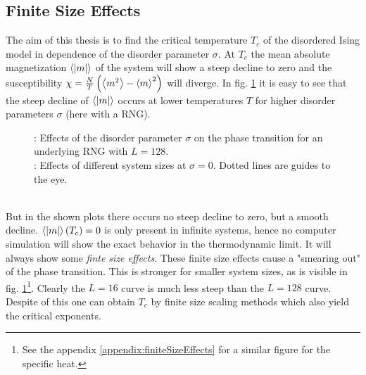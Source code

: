 \subsection{Finite Size Effects}
\label{ssec:finitesize}
    The aim of this thesis is to find the critical temperature \(T_c\)
    of the disordered Ising model in dependence of the disorder parameter
    \(\sigma\). At \(T_c\) the mean absolute magnetization \(\left< |m| \right>\) of
    the system will show a steep decline to zero and the susceptibility
    \(\chi = \frac{N}{T}\left(\left< m^2 \right>-\left< m \right>^2\right)\)
    will diverge. In fig. \ref{fig:smeared_out}
    it is easy to see that the steep decline of \(\left< |m| \right>\)
    occurs at lower temperatures \(T\) for higher
    disorder parameters \(\sigma\) (here with a RNG).
    \begin{figure}[htbp]
        \centering
        \caption[Phase Transition and Finite Size Effects]
        {
            : Effects of the disorder
            parameter $\sigma$ on the phase transition
            for an underlying RNG with $L=128$.\\
            : Effects of different system
            sizes at \(\sigma = 0\). Dotted lines are guides to the eye.
        }
        \label{fig:smeared_out}
    \end{figure}\\
    But in the shown plots there occurs no steep decline to zero, but a
    smooth decline. \(\left< \left\vert m\right\vert \right>(T_c) = 0\) is only present in infinite
    systems, hence no computer simulation will show the exact behavior in the
    thermodynamic limit. It will always show some \emph{finte size effects}.
    These finite size effects cause a "smearing out" of the phase
    transition. This is stronger for smaller system sizes, as is visible
    in fig. \ref{fig:smeared_out}\footnote{See the appendix \ref{appendix:finiteSizeEffects} for a similar figure for the specific heat.}.
    Clearly the \(L=16\) curve is much less steep than the \(L=128\) curve.\\
    Despite of this one can obtain \(T_c\) by finite size scaling
    methods \cite[S. ??]{NewmanBarkema1999} which also yield the critical
    exponents.

